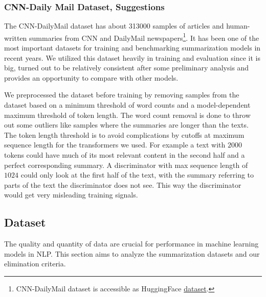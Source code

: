 \documentclass[11pt]{article}
\begin{document}
\subsubsection{CNN-Daily Mail Dataset, Suggestions}
The CNN-DailyMail dataset has about 313000 samples of articles and human-written summaries from CNN and DailyMail newspapers\footnote{CNN-DailyMail dataset is accessible as HuggingFace \href{https://huggingface.co/datasets/cnn_dailymail}{dataset}.}. It has been one of the most important datasets for training and benchmarking summarization models in recent years. We utilized this dataset heavily in training and evaluation since it is big, turned out to be relatively consistent after some preliminary analysis and provides an opportunity to compare with other models.

We preprocessed the dataset before training by removing samples from the dataset based on a minimum threshold of word counts and a model-dependent maximum threshold of token length. The word count removal is done to throw out some outliers like samples where the summaries are longer than the texts. The token length threshold is to avoid complications by cutoffs at maximum sequence length for the transformers we used. For example a text with $2000$ tokens could have much of its most relevant content in the second half and a perfect corresponding summary. A discriminator with max sequence length of $1024$ could only look at the first half of the text, with the summary referring to parts of the text the discriminator does not see. This way the discriminator would get very misleading training signals.

\subsection{Dataset}\label{subsection: dataset}

The quality and quantity of data are crucial for performance in machine learning models in NLP. This section aims to analyze the summarization datasets and our elimination criteria.
\end{document}
